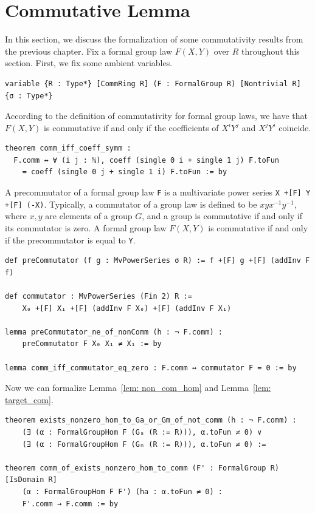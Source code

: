 \section{Commutative Lemma}

In this section, we discuss the formalization of some commutativity results from the previous
chapter. Fix a formal group law $F(X,Y)$ over $R$ throughout this section.
First, we fix some ambient variables.

\begin{lstlisting}
variable {R : Type*} [CommRing R] (F : FormalGroup R) [Nontrivial R] {σ : Type*}
\end{lstlisting}

According to the definition of commutativity for formal group laws, we have that $F(X,Y)$ is
commutative if and only if the coefficients of $X^i Y^j$ and $X^j Y^i$ coincide.

\begin{lstlisting}
theorem comm_iff_coeff_symm :
  F.comm ↔ ∀ (i j : ℕ), coeff (single 0 i + single 1 j) F.toFun
    = coeff (single 0 j + single 1 i) F.toFun := by
\end{lstlisting}

A precommutator of a formal group law \lstinline|F| is a multivariate power series
\lstinline|X +[F] Y +[F] (-X)|. Typically, a commutator of a group law is defined to be
$x y x^{-1} y^{-1}$, where $x, y$ are elements of a group $G$, and a group is commutative if and only
if its commutator is zero.
A formal group law $F(X,Y)$ is commutative if and only if the precommutator is equal to
\lstinline|Y|.

\begin{lstlisting}
def preCommutator (f g : MvPowerSeries σ R) := f +[F] g +[F] (addInv F f)

def commutator : MvPowerSeries (Fin 2) R :=
    X₀ +[F] X₁ +[F] (addInv F X₀) +[F] (addInv F X₁)

lemma preCommutator_ne_of_nonComm (h : ¬ F.comm) :
    preCommutator F X₀ X₁ ≠ X₁ := by

lemma comm_iff_commutator_eq_zero : F.comm ↔ commutator F = 0 := by
\end{lstlisting}

Now we can formalize Lemma~\ref{lem: non_com_hom} and Lemma~\ref{lem: target_com}.

\begin{lstlisting}
theorem exists_nonzero_hom_to_Ga_or_Gm_of_not_comm (h : ¬ F.comm) :
    (∃ (α : FormalGroupHom F (Gₐ (R := R))), α.toFun ≠ 0) ∨
    (∃ (α : FormalGroupHom F (Gₘ (R := R))), α.toFun ≠ 0) :=

theorem comm_of_exists_nonzero_hom_to_comm (F' : FormalGroup R) [IsDomain R]
    (α : FormalGroupHom F F') (ha : α.toFun ≠ 0) :
    F'.comm → F.comm := by
\end{lstlisting}

